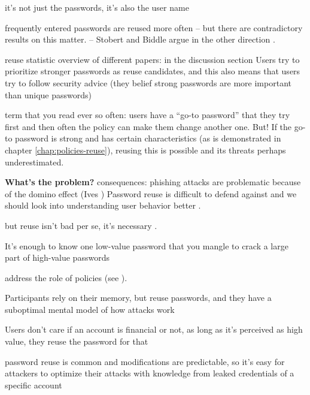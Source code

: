 	it's not just the passwords, it's also the user name 
	
	frequently entered passwords are reused more often \cite{Wash2016UnderstandingPasswordChoices} -- but there are contradictory results on this matter. -- Stobert and Biddle argue in the other direction \cite{Stobert2014PasswordLifeCycle}. 
	
	reuse statistic overview of different papers: 
	\cite{Wash2016UnderstandingPasswordChoices} in the discussion section
	Users try to prioritize stronger passwords as reuse candidates, and this also means that users try to follow security advice (they belief strong passwords are more important than unique passwords) \cite{Wash2016UnderstandingPasswordChoices}
	
	term that you read ever so often: users have a ``go-to password'' that they try first
	and then often the policy can make them change another one. But! If the go-to password is strong and has certain characteristics (as is demonstrated in chapter \ref{chap:policies-reuse}), reusing this is possible and its threats perhaps underestimated. 
	
	\textbf{What's the problem?}
	consequences: phishing attacks are problematic because of the domino effect (Ives \etal) Password reuse is difficult to defend against and we should look into understanding user behavior better \cite{Ives2004DominoEffectReuse}.
	
	but reuse isn't bad per se, it's necessary \cite{Florencio2014PasswordPortfoliosFiniteUser, ZhangKennedy2016RevisitingPasswordRules}. 
	

	
	
	It's enough to know one low-value password that you mangle to crack a large part of high-value passwords \cite{Haque2014Hierarchy}
	
	
	address the role of policies (see \cite{Seitz2017PoliciesReuse}).
	
	Participants rely on their memory, but reuse passwords, and they have a suboptimal mental model of how attacks work \cite{Gaw2006PasswordManagement}
	
	Users don't care if an account is financial or not, as long as it's perceived as high value, they reuse the password for that \cite{Bailey2014StatisticsReuse}
	
	password reuse is common and modifications are predictable, so it's easy for attackers to optimize their attacks with knowledge from leaked credentials of a specific account \cite{Das2014TangledWeb}

